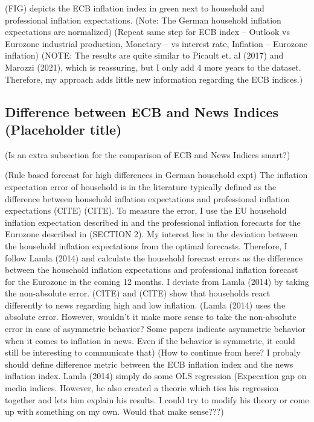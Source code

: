\documentclass[review]{elsarticle}
\begin{document}
(FIG) depicts the ECB inflation index in green next to household and professional inflation expectations.
(Note: The German household inflation expectations are normalized)
(Repeat same step for ECB index – Outlook vs Eurozone industrial production, Monetary – vs interest rate, Inflation – Eurozone inflation)
(NOTE: The results are quite similar to Picault et. al (2017) and Marozzi (2021), which is reassuring, but I only add 4 more years to the dataset. Therefore, my approach adds little new information regarding the ECB indices.)

\subsection{Difference between ECB and News Indices (Placeholder title)}\label{sec:Difference between ECB and News Indices (Placeholder title)}

(Is an extra subsection for the comparison of ECB and News Indices smart?)

(Rule based forecast for high differences in German household expt)
The inflation expectation error of household is in the literature typically defined as the difference between household inflation expectations and professional inflation expectations (CITE) (CITE). To measure the error, I use the EU household inflation expectation described in and the professional inflation forecasts for the Eurozone described in (SECTION 2). My interest lies in the deviation between the household inflation expectations from the optimal forecasts. Therefore, I follow Lamla (2014) and calculate the household forecast errors as the difference between the household inflation expectations and professional inflation forecast for the Eurozone in the coming 12 months. I deviate from Lamla (2014) by taking the non-absolute error. (CITE) and (CITE) show that households react differently to news regarding high and low inflation.
(Lamla (2014) uses the absolute error. However, wouldn't it make more sense to take the non-absolute error in case of asymmetric behavior? Some papers indicate asymmetric behavior when it comes to inflation in news. Even if the behavior is symmetric, it could still be interesting to communicate that)
(How to continue from here? I probaly should define difference metric between the ECB inflation index and the news inflation index. Lamla (2014) simply do some OLS regression (Expecation gap on media indices. However, he also created a theorie which ties his regression together and lets him explain his results. I could try to modify his theory or come up with something on my own. Would that make sense???)
\end{document}
